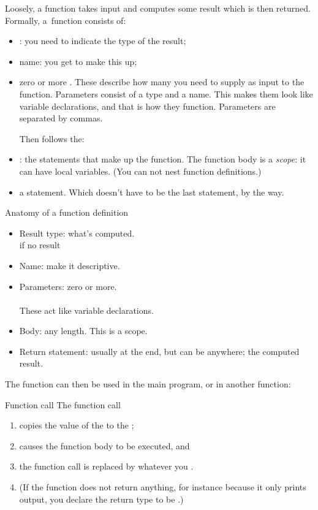 Loosely, a function takes input and computes some result which is then returned.
Formally, a~function consists of:
\begin{itemize}
\item {}: you need to indicate
  the type of the result;
\item name: you get to make this up;
\item zero or more . These describe
  how many  you need to supply as
  input to the function. Parameters consist of a type and a name. This
  makes them look like variable declarations, and that is how they
  function. Parameters are separated by commas.

  Then follows the:
\item {}: the statements that make up
  the function. The function body is a \emph{scope}: it can have local
  variables. (You can not nest function definitions.)
\item a  statement. Which doesn't have to be
  the last statement, by the way.
\end{itemize}

\begin{slide}{Anatomy of a function definition}
  \label{sl:func-anatomy}
  \begin{itemize}
  \item Result type: what's computed.\\  if no result
  \item Name: make it descriptive.
  \item Parameters: zero or more.\\
    \\
    These act like variable declarations.
  \item Body: any length. This is a scope.
  \item Return statement: usually at the end, but can be anywhere; the
    computed result.
  \end{itemize}
\end{slide}

The function can then be used in the main program, or in another function:
\begin{block}{Function call}
  \label{sl:func-call}
  The function call
  \begin{enumerate}
  \item copies the value of the 
    to the ;
  \item causes the function body to be executed, and
  \item the function call is replaced by whatever you .
  \item (If the function does not return anything, for instance because
    it only prints output, you declare the return type to be .)
  \end{enumerate}
\end{block}

